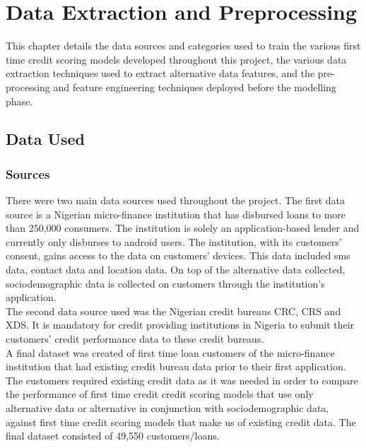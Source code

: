 \chapter{Data Extraction and Preprocessing} 
\label{Chapter3}

This chapter details the data sources and categories used to train the various first time credit scoring models developed throughout this project, the various data extraction techniques used to extract alternative data features, and the pre-processing and feature engineering techniques deployed before the modelling phase.   


\section{Data Used}

\subsection{Sources}

There were two main data sources used throughout the project. The first data source is a Nigerian micro-finance institution that has disbursed loans to more than 250,000 consumers. The institution is solely an application-based lender and currently only disburses to android users. The institution, with its customers' consent, gains access to the data on customers' devices. This data included sms data, contact data and location data. On top of the alternative data collected, sociodemographic data is collected on customers through the institution's application. \\

The second data source used was the Nigerian credit bureaus CRC, CRS and XDS. It is mandatory for credit providing institutions in Nigeria to submit their customers' credit performance data to these credit bureaus. \\

A final dataset was created of first time loan customers of the micro-finance institution that had existing credit bureau data prior to their first application. The customers required existing credit data as it was needed in order to compare the performance of first time credit credit scoring models that use only alternative data or alternative in conjunction with sociodemographic data, against first time credit scoring models that make us of existing credit data. The final dataset consisted of 49,550 customers/loans. 

